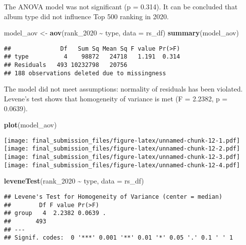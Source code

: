 \documentclass[
]{article}
\newenvironment{Shaded}{\begin{snugshade}}{\end{snugshade}}
\newcommand{\AttributeTok}[1]{\textcolor[rgb]{0.13,0.29,0.53}{#1}}
\newcommand{\FunctionTok}[1]{\textcolor[rgb]{0.13,0.29,0.53}{\textbf{#1}}}
\newcommand{\NormalTok}[1]{#1}
\newcommand{\OtherTok}[1]{\textcolor[rgb]{0.56,0.35,0.01}{#1}}
\newcommand{\SpecialCharTok}[1]{\textcolor[rgb]{0.81,0.36,0.00}{\textbf{#1}}}
\begin{document}
The ANOVA model was not significant (p = 0.314). It can be concluded
that album type did not influence Top 500 ranking in 2020.

\begin{Shaded}
\begin{Highlighting}[]
\NormalTok{model\_aov }\OtherTok{\textless{}{-}} \FunctionTok{aov}\NormalTok{(rank\_2020 }\SpecialCharTok{\textasciitilde{}}\NormalTok{ type, }\AttributeTok{data =}\NormalTok{ rs\_df)}
\FunctionTok{summary}\NormalTok{(model\_aov)}
\end{Highlighting}
\end{Shaded}

\begin{verbatim}
##              Df   Sum Sq Mean Sq F value Pr(>F)
## type          4    98872   24718   1.191  0.314
## Residuals   493 10232798   20756               
## 188 observations deleted due to missingness
\end{verbatim}

The model did not meet assumptions: normality of residuals has been
violated. Levene's test shows that homogeneity of variance is met (F =
2.2382, p = 0.0639).

\begin{Shaded}
\begin{Highlighting}[]
\FunctionTok{plot}\NormalTok{(model\_aov)}
\end{Highlighting}
\end{Shaded}

\texttt{[image: final\_submission\_files/figure-latex/unnamed-chunk-12-1.pdf]}
\texttt{[image: final\_submission\_files/figure-latex/unnamed-chunk-12-2.pdf]}
\texttt{[image: final\_submission\_files/figure-latex/unnamed-chunk-12-3.pdf]}
\texttt{[image: final\_submission\_files/figure-latex/unnamed-chunk-12-4.pdf]}

\begin{Shaded}
\begin{Highlighting}[]
\FunctionTok{leveneTest}\NormalTok{(rank\_2020 }\SpecialCharTok{\textasciitilde{}}\NormalTok{ type, }\AttributeTok{data =}\NormalTok{ rs\_df)}
\end{Highlighting}
\end{Shaded}

\begin{verbatim}
## Levene's Test for Homogeneity of Variance (center = median)
##        Df F value Pr(>F)  
## group   4  2.2382 0.0639 .
##       493                 
## ---
## Signif. codes:  0 '***' 0.001 '**' 0.01 '*' 0.05 '.' 0.1 ' ' 1
\end{verbatim}
\end{document}
